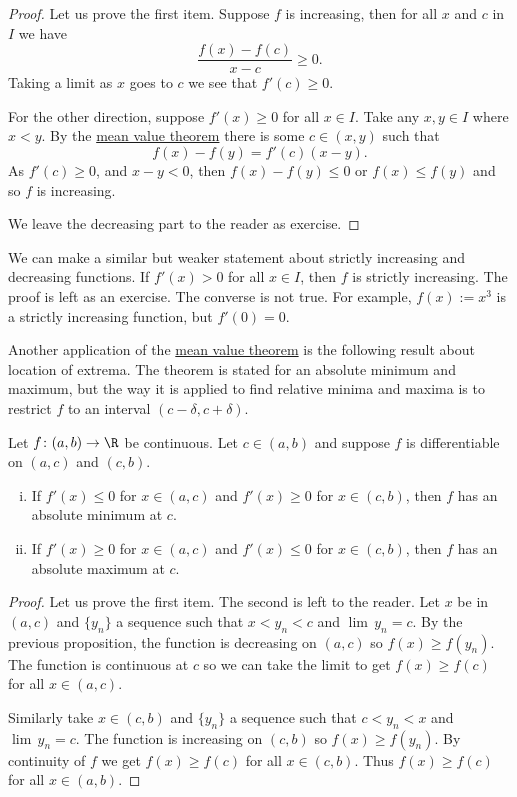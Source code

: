 \documentclass[12pt]{book}
\begin{document}
\begin{proof}
Let us prove the first item.
Suppose $f$ is increasing, then
for all $x$ and $c$ in $I$ we have
\begin{equation*}
\frac{f(x)-f(c)}{x-c} \geq 0 .
\end{equation*}
Taking a limit as $x$ goes to $c$ we see that $f'(c) \geq 0$.

For the other direction, suppose $f'(x) \geq 0$ for all $x \in I$.
Take any $x, y \in I$ where $x < y$.
By the \hyperref[thm:mvt]{mean value theorem}
there is some $c \in
(x,y)$ such that
\begin{equation*}
f(x)-f(y) = f'(c)(x-y) .
\end{equation*}
As $f'(c) \geq 0$, and $x-y < 0$, then $f(x) - f(y) \leq 0$ or $f(x) \leq
f(y)$ and so
$f$ is increasing.

We leave the decreasing part to the reader as exercise.
\end{proof}

\begin{example}
We can make a similar but weaker statement about strictly increasing and
decreasing functions.
If $f'(x) > 0$ for all $x \in I$, then
$f$ is strictly increasing.
The proof is left as an exercise.
The converse is not true.
For example,
$f(x) := x^3$ is a strictly increasing function, but $f'(0) = 0$.
\end{example}

Another application of the \hyperref[thm:mvt]{mean value theorem} is the following result about
location of extrema.
The theorem is stated for an absolute minimum and
maximum, but the way it is applied to find relative minima
and maxima is to restrict $f$ to an interval $(c-\delta,c+\delta)$.

\begin{prop} \label{firstderminmaxtest}
Let $f \colon (a,b) \to \R$ be continuous.
Let $c \in (a,b)$
and suppose
$f$ is differentiable on $(a,c)$ and $(c,b)$.
\begin{enumerate}[(i)]
\item If $f'(x) \leq 0$ for $x \in (a,c)$ and
 $f'(x) \geq 0$ for $x \in (c,b)$, then $f$ has an absolute minimum 
at $c$.
\item If $f'(x) \geq 0$ for $x \in (a,c)$ and
 $f'(x) \leq 0$ for $x \in (c,b)$, then $f$ has an absolute maximum
at $c$.
\end{enumerate}
\end{prop}

\begin{proof}
Let us prove the first item.
The second is left to the reader.
Let $x$ be in $(a,c)$
and $\{ y_n\}$ a sequence such that $x < y_n < c$ and $\lim\, y_n = c$.
By the previous proposition,
the function is decreasing on $(a,c)$ so $f(x) \geq f(y_n)$.
The function is continuous at $c$ so we can take the limit to get
$f(x) \geq f(c)$ for all $x \in (a,c)$.

Similarly take $x \in (c,b)$
and $\{ y_n\}$ a sequence such that $c < y_n < x$ and $\lim\, y_n = c$.
The function is increasing on $(c,b)$ so $f(x) \geq f(y_n)$.
By continuity of $f$ we get
$f(x) \geq f(c)$ for all $x \in (c,b)$.
Thus $f(x) \geq f(c)$ for all
$x \in (a,b)$.
\end{proof}
\end{document}
